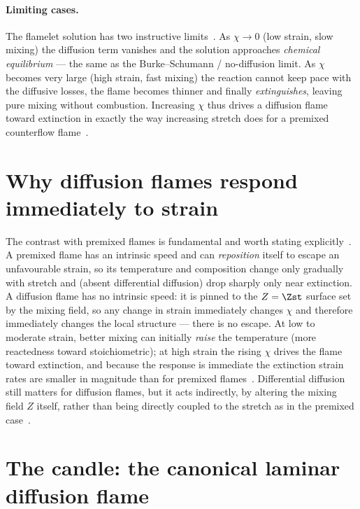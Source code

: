 \paragraph{Limiting cases.} The flamelet solution has two instructive limits~\cite{lecture9,transcript_l9}. As $\chi\to0$ (low strain, slow mixing) the diffusion term vanishes and the solution approaches \emph{chemical equilibrium} --- the same as the Burke--Schumann / no-diffusion limit. As $\chi$ becomes very large (high strain, fast mixing) the reaction cannot keep pace with the diffusive losses, the flame becomes thinner and finally \emph{extinguishes}, leaving pure mixing without combustion. Increasing $\chi$ thus drives a diffusion flame toward extinction in exactly the way increasing stretch does for a premixed counterflow flame~\cite{lecture9}.

\section{Why diffusion flames respond immediately to strain}

The contrast with premixed flames is fundamental and worth stating explicitly~\cite{lecture9,transcript_l9}. A premixed flame has an intrinsic speed and can \emph{reposition} itself to escape an unfavourable strain, so its temperature and composition change only gradually with stretch and (absent differential diffusion) drop sharply only near extinction. A diffusion flame has no intrinsic speed: it is pinned to the $Z=\Zst$ surface set by the mixing field, so any change in strain immediately changes $\chi$ and therefore immediately changes the local structure --- there is no escape. At low to moderate strain, better mixing can initially \emph{raise} the temperature (more reactedness toward stoichiometric); at high strain the rising $\chi$ drives the flame toward extinction, and because the response is immediate the extinction strain rates are smaller in magnitude than for premixed flames~\cite{lecture9}. Differential diffusion still matters for diffusion flames, but it acts indirectly, by altering the mixing field $Z$ itself, rather than being directly coupled to the stretch as in the premixed case~\cite{lecture9,transcript_l9}.

\section{The candle: the canonical laminar diffusion flame}

